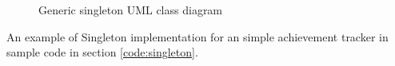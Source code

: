 \begin{multicols}{2}
\begin{figure}[H]
	\centering


	\caption{Generic singleton UML class diagram}
	\label{fig:singleton}
\end{figure}

An example of Singleton implementation for an simple achievement tracker in sample code in section \ref{code:singleton}.

\iftwocolumns
\end{multicols}
\fi